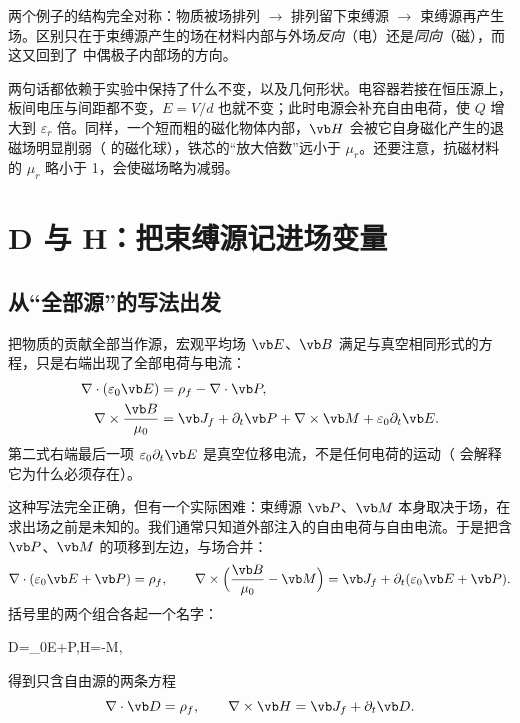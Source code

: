 两个例子的结构完全对称：物质被场排列 $\rightarrow$ 排列留下束缚源 $\rightarrow$ 束缚源再产生场。区别只在于束缚源产生的场在材料内部与外场\emph{反向}（电）还是\emph{同向}（磁），而这又回到了 中偶极子内部场的方向。

\begin{pitfall}
两句话都依赖于实验中保持了什么不变，以及几何形状。电容器若接在恒压源上，板间电压与间距都不变，$E=V/d$ 也就不变；此时电源会补充自由电荷，使 $Q$ 增大到 $\varepsilon_r$ 倍。同样，一个短而粗的磁化物体内部，$\vb H$ 会被它自身磁化产生的退磁场明显削弱（ 的磁化球），铁芯的“放大倍数”远小于 $\mu_r$。还要注意，抗磁材料的 $\mu_r$ 略小于 1，会使磁场略为减弱。
\end{pitfall}

\section{D 与 H：把束缚源记进场变量}\label{sec:matter-DH}

\subsection{从“全部源”的写法出发}
把物质的贡献全部当作源，宏观平均场 $\vb E$、$\vb B$ 满足与真空相同形式的方程，只是右端出现了全部电荷与电流：
\begin{align}
\nabla\cdot(\varepsilon_0\vb E)&=\rho_f-\nabla\cdot\vb P,\label{eq:allsourcegauss}\\
\nabla\times\frac{\vb B}{\mu_0}&=\vb J_f+\partial_t\vb P+\nabla\times\vb M+\varepsilon_0\partial_t\vb E.\label{eq:allsourceampere}
\end{align}
第二式右端最后一项 $\varepsilon_0\partial_t\vb E$ 是真空位移电流，不是任何电荷的运动（ 会解释它为什么必须存在）。

这种写法完全正确，但有一个实际困难：束缚源 $\vb P$、$\vb M$ 本身取决于场，在求出场之前是未知的。我们通常只知道外部注入的自由电荷与自由电流。于是把含 $\vb P$、$\vb M$ 的项移到左边，与场合并：
\begin{gather}
\nabla\cdot(\varepsilon_0\vb E+\vb P)=\rho_f,\qquad
\nabla\times\Bigl(\frac{\vb B}{\mu_0}-\vb M\Bigr)=\vb J_f+\partial_t(\varepsilon_0\vb E+\vb P).
\end{gather}
括号里的两个组合各起一个名字：
\begin{keyeq}
\vb D=\varepsilon_0\vb E+\vb P,\qquad \vb H=-\vb M,
\label{eq:materialdefinitions}
\end{keyeq}
得到只含自由源的两条方程
\begin{equation}
\nabla\cdot\vb D=\rho_f,\qquad \nabla\times\vb H=\vb J_f+\partial_t\vb D .
\label{eq:freeDH}
\end{equation}

